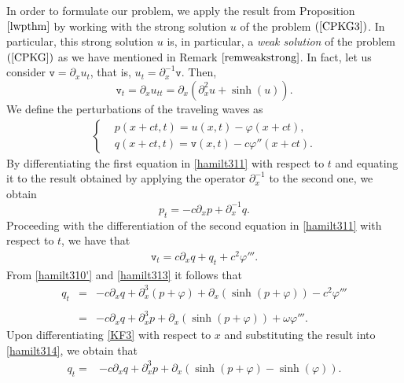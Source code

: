 \documentclass[12pt,reqno,a4paper]{amsart} %
\numberwithin{equation}{section}
\numberwithin{figure}{section}
\begin{document}
 In order to formulate our problem, we apply the result from Proposition $\ref{lwpthm}$ by working with the strong solution $u$ of the problem $(\ref{CPKG3})$. In particular, this strong solution $u$ is, in particular, a \textit{weak solution} of the problem $(\ref{CPKG})$ as we have mentioned in Remark $\ref{remweakstrong}$. In fact,  let us consider $\mathtt{v}=\partial_x u_t$, that is, $u_t =\partial_x^{-1 }\mathtt{v}$. Then,
 \begin{equation}\label{hamilt310'}
 	\mathtt{v}_t=\partial_x u_{tt}=\partial_x( \partial_x^2u + \sinh(u)). 
 \end{equation} We define the perturbations of the traveling waves as
  \begin{align}\label{hamilt311}
 	\begin{cases}
 		&p(x+ct,t)=u(x,t)-\varphi(x+ct), \\ 
 		&q(x+ct,t)=\mathtt{v}(x,t)-c\varphi''(x+ct).
 	\end{cases}	
 \end{align}  
 By differentiating the first equation in \eqref{hamilt311} with respect to $t$ and equating it to the result obtained by applying the operator $\partial_x^{-1}$ to the second one, we obtain 
 \begin{equation}\label{hamilt312}
 	p_t=-c\partial_x p+\partial_x^{-1 }q.
 \end{equation}
Proceeding with the differentiation of the second equation in \eqref{hamilt311} with respect to $t$, we have that 
 \begin{align}\label{hamilt313}
 	\mathtt{v}_t=c\partial_x q+q_t+c^2 \varphi'''.
 \end{align}
 From \eqref{hamilt310'} and \eqref{hamilt313} it follows that 
 \begin{equation}\label{hamilt314}\begin{array}{llllll}
 	q_t&=&\displaystyle-c\partial_x q+\partial_x^3(p+\varphi) +  \partial_x(\sinh(p+\varphi))-c^2 \varphi'''\\\\
 	&=&\displaystyle-c\partial_x q+\partial_x^3 p+\partial_x(\sinh(p+\varphi))+\omega\varphi '''. 
 \end{array}\end{equation}
Upon differentiating \eqref{KF3} with respect to $x$ and substituting the result into \eqref{hamilt314}, we obtain that
 \begin{align}\label{hamilt315}
 	q_t=&-c\partial_x q+\partial_x^3 p+\partial_x(\sinh(p+\varphi)-\sinh(\varphi)). 
 \end{align}
\end{document}
